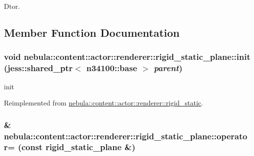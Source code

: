Dtor. 

\subsection{Member Function Documentation}
\hypertarget{classnebula_1_1content_1_1actor_1_1renderer_1_1rigid__static__plane_aae78beb9e7389ea77d6a8103ec388972}{
\subsubsection[{init}]{\setlength{\rightskip}{0pt plus 5cm}void nebula::content::actor::renderer::rigid\_\-static\_\-plane::init (jess::shared\_\-ptr$<$ {\bf n34100::base} $>$ {\em parent})}}
\label{classnebula_1_1content_1_1actor_1_1renderer_1_1rigid__static__plane_aae78beb9e7389ea77d6a8103ec388972}


init 

Reimplemented from \hyperlink{classnebula_1_1content_1_1actor_1_1renderer_1_1rigid__static_a44a1c6a982296b5f1d4c0919c2c4ecf1}{nebula::content::actor::renderer::rigid\_\-static}.\hypertarget{classnebula_1_1content_1_1actor_1_1renderer_1_1rigid__static__plane_a6038d69ad558ad5bfa9e52a7f01afd0b}{
\subsubsection[{operator=}]{\& nebula::content::actor::renderer::rigid\_\-static\_\-plane::operator= (const {\bf rigid\_\-static\_\-plane} \&)}}
\label{classnebula_1_1content_1_1actor_1_1renderer_1_1rigid__static__plane_a6038d69ad558ad5bfa9e52a7f01afd0b}


